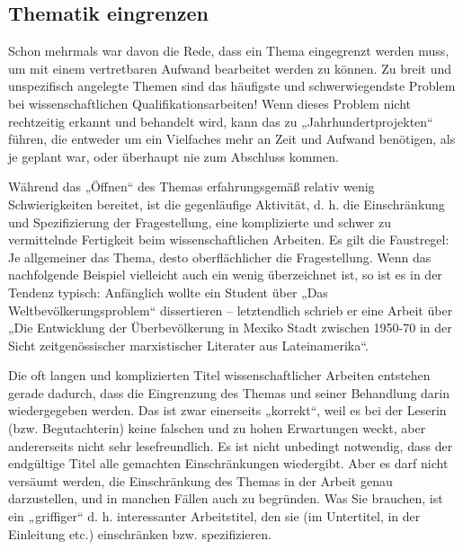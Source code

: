 \documentclass[]{book}
\theoremstyle{definition}
\theoremstyle{definition}
\theoremstyle{definition}
\theoremstyle{remark}
\begin{document}
\subsection{Thematik eingrenzen}\label{thematik-eingrenzen}

Schon mehrmals war davon die Rede, dass ein Thema eingegrenzt werden
muss, um mit einem vertretbaren Aufwand bearbeitet werden zu können. Zu
breit und unspezifisch angelegte Themen sind das häufigste und
schwerwiegendste Problem bei wissenschaftlichen Qualifikationsarbeiten!
Wenn dieses Problem nicht rechtzeitig erkannt und behandelt wird, kann
das zu „Jahrhundertprojekten`` führen, die entweder um ein Vielfaches
mehr an Zeit und Aufwand benötigen, als je geplant war, oder überhaupt
nie zum Abschluss kommen.

Während das „Öffnen`` des Themas erfahrungsgemäß relativ wenig
Schwierigkeiten bereitet, ist die gegenläufige Aktivität, d. h. die
Einschränkung und Spezifizierung der Fragestellung, eine komplizierte
und schwer zu vermittelnde Fertigkeit beim wissenschaftlichen Arbeiten.
Es gilt die Faustregel: Je allgemeiner das Thema, desto oberflächlicher
die Fragestellung. Wenn das nachfolgende Beispiel vielleicht auch ein
wenig überzeichnet ist, so ist es in der Tendenz typisch: Anfänglich
wollte ein Student über „Das Weltbevölkerungsproblem`` dissertieren --
letztendlich schrieb er eine Arbeit über „Die Entwicklung der
Überbevölkerung in Mexiko Stadt zwischen 1950-70 in der Sicht
zeitgenössischer marxistischer Literater aus Lateinamerika``.

Die oft langen und komplizierten Titel wissenschaftlicher Arbeiten
entstehen gerade dadurch, dass die Eingrenzung des Themas und seiner
Behandlung darin wiedergegeben werden. Das ist zwar einerseits
„korrekt``, weil es bei der Leserin (bzw. Begutachterin) keine falschen
und zu hohen Erwartungen weckt, aber andererseits nicht sehr
lesefreundlich. Es ist nicht unbedingt notwendig, dass der endgültige
Titel alle gemachten Einschränkungen wiedergibt. Aber es darf nicht
versäumt werden, die Einschränkung des Themas in der Arbeit genau
darzustellen, und in manchen Fällen auch zu begründen. Was Sie brauchen,
ist ein „griffiger`` d. h. interessanter Arbeitstitel, den sie (im
Untertitel, in der Einleitung etc.) einschränken bzw. spezifizieren.
\end{document}
